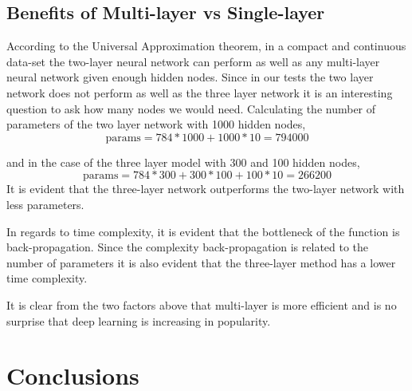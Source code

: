 \documentclass[12pt, twocolumn]{article}
\begin{document}
\subsection{Benefits of Multi-layer vs Single-layer}
According to the Universal Approximation theorem, in a compact and continuous data-set the two-layer neural network can perform as well as any multi-layer neural network given enough hidden nodes. Since in our tests the two layer network does not perform as well as the three layer network it is an interesting question to ask how many nodes we would need. Calculating the number of parameters of the two layer network with 1000 hidden nodes, 
\begin{equation*}
\textrm{params} = 784*1000 + 1000* 10 = 794000
\end{equation*}

and in the case of the three layer model with 300 and 100 hidden nodes,
\begin{equation*}
\textrm{params} = 784*300 + 300*100 + 100* 10 = 266200
\end{equation*}
It is evident that the three-layer network outperforms the two-layer network with less parameters. 

In regards to time complexity, it is evident that the bottleneck of the function is back-propagation. Since the complexity back-propagation is related to the number of parameters it is also evident that the three-layer method has a lower time complexity.

It is clear from the two factors above that multi-layer is more efficient and is no surprise that deep learning is increasing in popularity.


\section{Conclusions}






\end{document}
